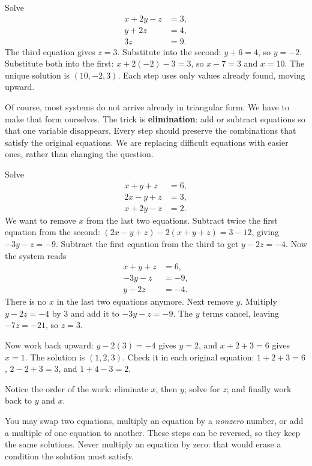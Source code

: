 \documentclass[12pt]{book}
\begin{document}
\begin{example}
Solve
\[
\begin{aligned}
x+2y-z&=3,\\
y+2z&=4,\\
3z&=9.
\end{aligned}
\]
The third equation gives $z=3$. Substitute into the second: $y+6=4$, so $y=-2$.
Substitute both into the first: $x+2(-2)-3=3$, so $x-7=3$ and $x=10$. The unique
solution is $(10,-2,3)$. Each step uses only values already found, moving upward.
\end{example}

Of course, most systems do not arrive already in triangular form.
We have to make that form ourselves. The trick is \textbf{elimination}:
add or subtract equations so that one variable disappears. Every step
should preserve the combinations that satisfy the original equations.
We are replacing difficult equations with easier ones, rather than
changing the question.

\begin{example}
Solve
\[
\begin{aligned}
x+y+z&=6,\\
2x-y+z&=3,\\
x+2y-z&=2.
\end{aligned}
\]
We want to remove $x$ from the last two equations. Subtract twice
the first equation from the second:
$(2x-y+z)-2(x+y+z)=3-12$, giving $-3y-z=-9$.
Subtract the first equation from the third to get $y-2z=-4$.
Now the system reads
\[
\begin{aligned}
x+y+z&=6,\\
-3y-z&=-9,\\
y-2z&=-4.
\end{aligned}
\]
There is no $x$ in the last two equations anymore. Next remove $y$.
Multiply $y-2z=-4$ by $3$ and add it to $-3y-z=-9$.
The $y$ terms cancel, leaving $-7z=-21$, so $z=3$.

Now work back upward: $y-2(3)=-4$ gives $y=2$, and
$x+2+3=6$ gives $x=1$. The solution is $(1,2,3)$.
Check it in each original equation:
$1+2+3=6$, $2-2+3=3$, and $1+4-3=2$.

Notice the order of the work: eliminate $x$, then $y$; solve
for $z$; and finally work back to $y$ and $x$.
\end{example}

\begin{pitfall}
You may swap two equations, multiply an equation by a \emph{nonzero}
number, or add a multiple of one equation to another. These steps
can be reversed, so they keep the same solutions. Never multiply an
equation by zero: that would erase a condition the solution must satisfy.
\end{pitfall}
\end{document}
